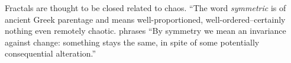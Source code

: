 Fractals are thought to be closed related to chaos.
\citet{schroeder} 
``The word \textit{symmetric} is of ancient Greek parentage and means well-proportioned, well-ordered--certainly nothing even remotely chaotic.
\citet[p.xiii-xv]{schroeder} phrases
``By symmetry we mean an invariance against change: something stays the same, in spite of some potentially consequential alteration.''


